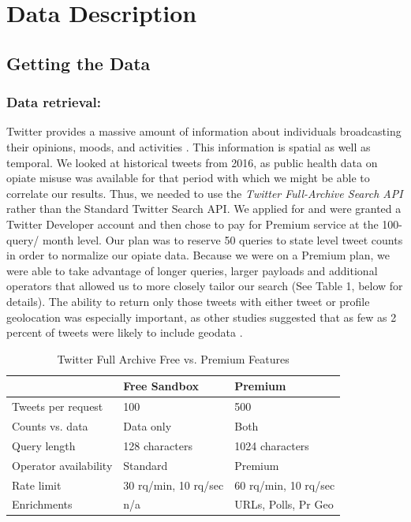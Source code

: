 \documentclass[sigconf]{acmart}
\begin{document}

\section{Data Description} 

\subsection{Getting the Data} 

\subsubsection{Data retrieval:}
Twitter provides a massive amount of information about individuals 
broadcasting their opinions, moods, and activities \cite{widener14}. 
This information is spatial as well as temporal. We looked at historical 
tweets from 2016, as public health data on opiate misuse was available for 
that period with which we might be able to correlate our results. Thus, we 
needed to use the \emph{Twitter Full-Archive Search API} rather than the 
Standard Twitter Search API. We applied for and were granted a Twitter 
Developer account and then chose to pay for Premium service at the 100-query/
month level. Our plan was to reserve 50 queries to state level tweet counts 
in order to normalize our opiate data. Because we were on a Premium plan, 
we were able to take advantage of longer queries, larger payloads and additional 
operators that allowed us to more closely tailor our search (See Table 1, 
below for details). The ability to return only those tweets with either tweet 
or profile geolocation was especially important, as other studies suggested 
that as few as 2 percent of tweets were likely to include geodata 
\cite{chary17, leetaru13}.

\begin{table}[htb]
  \centering
  \caption{Twitter Full Archive Free vs. Premium Features}
  \label{tab:mytable}
  \begin{tabular*}{\columnwidth}{lll}
    \toprule
                      	& Free Sandbox    & Premium \\
    \midrule
    Tweets per request	& 100	          & 500     \\
    Counts vs. data   	& Data only       & Both    \\
    Query length      	& 128 characters  & 1024 characters \\
    Operator availability & Standard	  & Premium         \\
    Rate limit        	& 30 rq/min, 10 rq/sec & 60 rq/min, 10 rq/sec \\
    Enrichments       	& n/a             & URLs, Polls, Pr Geo \\
    \bottomrule
  \end{tabular*}
\end{table}
\end{document}
